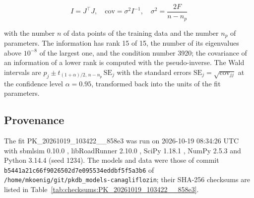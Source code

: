 \documentclass{article}
\begin{document}
\begin{equation}
I = J^\top J, \quad \mathrm{cov} = \sigma^2 I^{-1}, \quad \sigma^2 = \frac{2 F}{n - n_p}
\end{equation}

with the number $n$ of data points of the training data and the number $n_p$ of parameters. The information has rank 15 of 15, the number of its eigenvalues above $10^{-8}$ of the largest one, and the condition number 3920; the covariance of an information of a lower rank is computed with the pseudo-inverse. The Wald intervals are $\hat{p}_j \pm t_{(1+\alpha)/2,\, n-n_p}\, \mathrm{SE}_j$ with the standard errors $\mathrm{SE}_j = \sqrt{\mathrm{cov}_{jj}}$ at the confidence level $\alpha = 0.95$, transformed back into the units of the fit parameters.

\subsection{Provenance}

The fit PK\_20261019\_103422\_\_858e3 was run on 2026-10-19 08:34:26 UTC with sbmlsim 0.10.0 \cite{Koenig2026_sbmlsim}, libRoadRunner 2.10.0 \cite{Welsh2023}, SciPy 1.18.1 \cite{Virtanen2020}, NumPy 2.5.3 \cite{Harris2020} and Python 3.14.4 (seed 1234). The models and data were those of commit \texttt{b5441a21c66f9026502d7e095534eddbf5f5a3b6} of \texttt{/home/mkoenig/git/pkdb\_models-canagliflozin}; their SHA-256 checksums are listed in Table~\ref{tab:checksums:PK_20261019_103422__858e3}.
\end{document}
